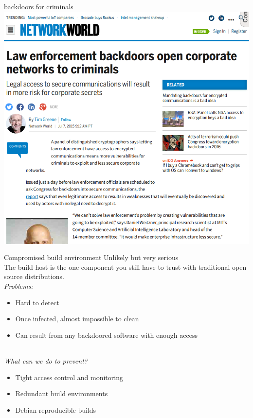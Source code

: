 \documentclass[11pt]{beamer}
\begin{document}
\begin{frame}{backdoors for criminals}
\includegraphics[scale=0.28]{backdoor_criminals.png}
\end{frame}

\begin{frame}{Compromised build environment}
Unlikely but very serious\\
The build host is the one component you still have to trust with traditional open source distributions. %
\\[0.2cm]
\emph{Problems:}
\begin{itemize}
\item Hard to detect
\item Once infected, almost impossible to clean
\item Can result from any backdoored software with enough access
\end{itemize}
\\[0.2cm]
\pause
\emph{What can we do to prevent?}
\begin{itemize}
\item Tight access control and monitoring
\item Redundant build environments  %
\item Debian reproducible builds    %
\end{itemize}
\end{frame}
\end{document}
